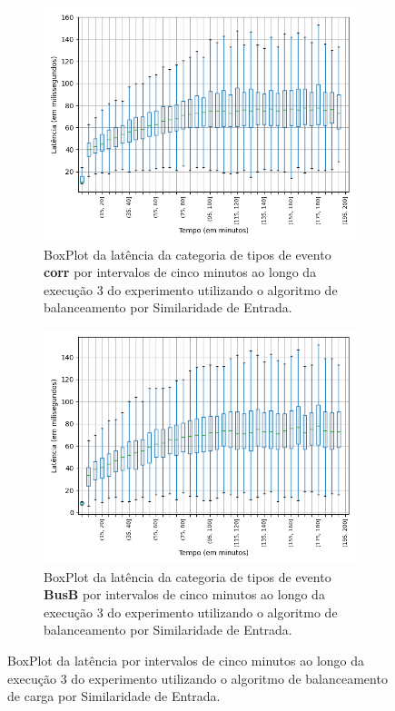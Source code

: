 \begin{figure}
\begin{subfigure}{.5\textwidth}
\centering
\includegraphics[width=\textwidth]{figuras/graphics/boxplot_8-dez-is_corr.png}
\caption{BoxPlot da latência da categoria de tipos de evento \textbf{corr} por intervalos de cinco minutos ao longo da execução 3 do experimento utilizando o algoritmo de balanceamento por Similaridade de Entrada.}
\label{fig:BoxPlot_corr_IS_8-dez-is}
\end{subfigure}%
\begin{subfigure}{.5\textwidth}
\centering
\includegraphics[width=\textwidth]{figuras/graphics/boxplot_8-dez-is_busb.png}
\caption{BoxPlot da latência da categoria de tipos de evento \textbf{BusB} por intervalos de cinco minutos ao longo da execução 3 do experimento utilizando o algoritmo de balanceamento por Similaridade de Entrada.}
\label{fig:BoxPlot_BusB_IS_8-dez-is}
\end{subfigure}%
\caption{BoxPlot da latência por intervalos de cinco minutos ao longo da execução 3 do experimento utilizando o algoritmo de balanceamento de carga por Similaridade de Entrada.}
\end{figure}



